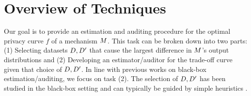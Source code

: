 \section{Overview of Techniques}\label{sec:overview_techniques}
Our goal is to provide an estimation and auditing procedure for the optimal privacy curve $f$ of a mechanism $M$. This task can be broken down into two parts: (1) Selecting datasets $D,D'$ that cause the largest difference in $M$'s output distributions and (2) Developing an estimator/auditor for the trade-off curve given that choice of $D, D'$. %
In line with previous works on black-box estimation/auditing, we focus on task (2). The selection of $D,D'$ has been studied in the black-box setting and can typically be guided by simple heuristics \cite{StatDP, DP-Sniper, Lokna2023}.%


